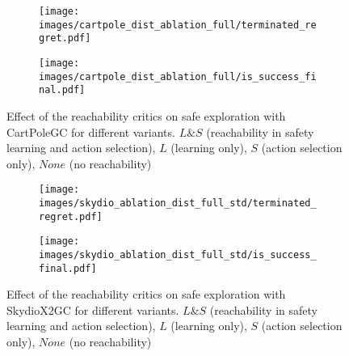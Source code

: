 \begin{figure}[ht]
    \begin{subfigure}{0.22\textwidth}  
        \centering 
        \texttt{[image: images/cartpole\_dist\_ablation\_full/terminated\_regret.pdf]}
        \caption{}
        \label{fig:cartpole_dist_ablation_full/terminated_regret}
    \end{subfigure}
    \hfill
    \begin{subfigure}{0.22\textwidth}
        \centering
        \texttt{[image: images/cartpole\_dist\_ablation\_full/is\_success\_final.pdf]}
        \caption{}
        \label{fig:cartpole_dist_ablation_full/is_success_final}
    \end{subfigure}
    \caption{Effect of the reachability critics on safe exploration with CartPoleGC for different variants. $L\&S$ (reachability in safety learning and action selection), $L$ (learning only), $S$ (action selection only), $None$ (no reachability)}
    \label{fig:cartpole_dist_ablation_full}
\end{figure}

\begin{figure}[ht]
    \begin{subfigure}{0.22\textwidth}  
        \centering 
        \texttt{[image: images/skydio\_ablation\_dist\_full\_std/terminated\_regret.pdf]}
        \caption{}
        \label{fig:skydio_ablation_dist_full_std/terminated_regret}
    \end{subfigure}
    \hfill
    \begin{subfigure}{0.22\textwidth}
        \centering
        \texttt{[image: images/skydio\_ablation\_dist\_full\_std/is\_success\_final.pdf]}
        \caption{}
        \label{fig:skydio_ablation_dist_full_std/is_success_final}
    \end{subfigure}
    \caption{Effect of the reachability critics on safe exploration with SkydioX2GC for different variants. $L\&S$ (reachability in safety learning and action selection), $L$ (learning only), $S$ (action selection only), $None$ (no reachability)}
    \label{fig:skydio_ablation_dist_full_std}
\end{figure}

